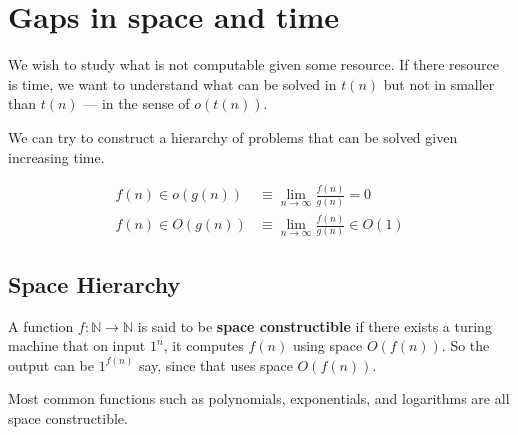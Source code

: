 \chapter{Gaps in space and time}

We wish to study what is not computable given some resource.
If there resource is time, we want to understand what can be solved
in $t(n)$ but not in smaller than $t(n)$ --- in the sense of $o(t(n))$.

We can try to construct a hierarchy of problems that can be solved
given increasing time. 

\begin{align*}
f(n) \in o(g(n)) &\equiv \lim_{n \to \infty} \frac{f(n)}{g(n)} = 0 \\
f(n) \in O(g(n)) &\equiv \lim_{n \to \infty} \frac{f(n)}{g(n)} \in  O(1)
\end{align*}

\section{Space Hierarchy}

A function $f: \mathbb{N} \to \mathbb{N}$ is said to be \textbf{space constructible}
if there exists a turing machine that on input $1^n$, it computes $f(n)$
using space $O(f(n))$. So the output can be $1^{f(n)}$ say, since that uses
space $O(f(n))$.

Most common functions such as polynomials, exponentials, and logarithms
are all space constructible.

